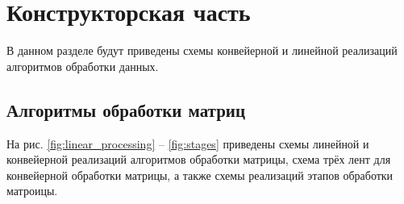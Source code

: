 \chapter{Конструкторская часть}

В данном разделе будут приведены схемы конвейерной и линейной реализаций алгоритмов обработки данных.

\section{Алгоритмы обработки матриц}

На рис. \ref{fig:linear_processing} -- \ref{fig:stages} приведены схемы линейной и конвейерной реализаций алгоритмов обработки матрицы, схема трёх лент для конвейерной обработки матрицы, а также схемы реализаций этапов обработки матроицы.


